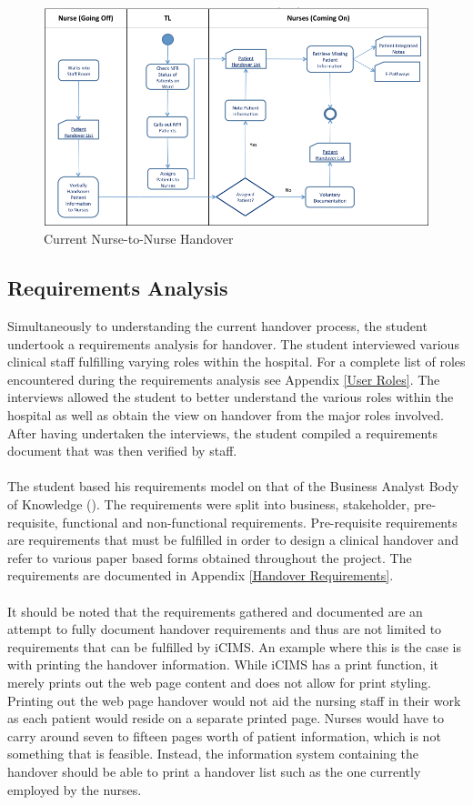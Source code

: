 \begin{figure}[hp]
				\centering
				\includegraphics[angle=-90,scale=1.0, width=120mm]{Images/Nurse-to-Nurse-Handover-Process-As-Is}
				\caption{Current Nurse-to-Nurse Handover}
\end{figure} 
\newpage

\subsection{Requirements Analysis}
Simultaneously to understanding the current handover process, the student undertook a requirements analysis for handover. The student interviewed various clinical staff fulfilling varying roles within the hospital. For a complete list of roles encountered during the requirements analysis see Appendix \ref{User Roles}. The interviews allowed the student to better understand the various roles within the hospital as well as obtain the view on handover from the major roles involved. After having undertaken the interviews, the student compiled a requirements document that was then verified by staff. 
\\ \\ 
The student based his requirements model on that of the Business Analyst Body of Knowledge (\cite{IIBA}). The requirements were split into business, stakeholder, pre-requisite, functional and non-functional requirements. Pre-requisite requirements are requirements that must be fulfilled in order to design a clinical handover and refer to various paper based forms obtained throughout the project.  The requirements are documented in Appendix \ref{Handover Requirements}.
\\ \\
It should be noted that the requirements gathered and documented are an attempt to fully document handover requirements and thus are not limited to requirements that can be fulfilled by iCIMS. An example where this is the case is with printing the handover information. While iCIMS has a print function, it merely prints out the web page content and does not allow for print styling. Printing out the web page handover would not aid the nursing staff in their work as each patient would reside on a separate printed page. Nurses would have to carry around seven to fifteen pages worth of patient information, which is not something that is feasible. Instead, the information system containing the handover should be able to print a handover list such as the one currently employed by the nurses.

